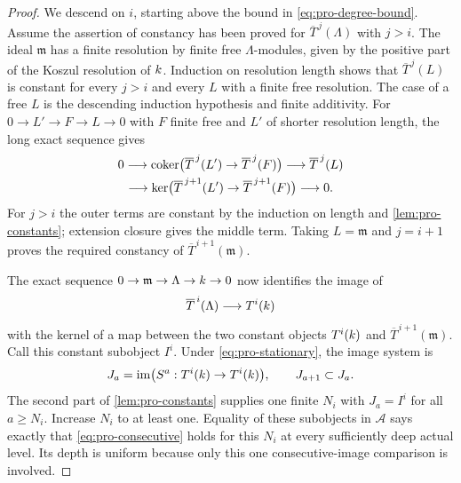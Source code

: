 
\begin{proof}
We descend on $i$, starting above the bound in
\cref{eq:pro-degree-bound}.  Assume the assertion of constancy has
been proved for $\overline T^{\,j}(\Lambda)$ with $j>i$.
The ideal $\mathfrak m$ has a finite resolution by finite free
$\Lambda$-modules, given by the positive part of the Koszul
resolution of $k$.  Induction on resolution length shows that
$\overline T^{\,j}(L)$ is constant for every $j>i$ and every $L$
with a finite free resolution.  The case of a free $L$ is the
descending induction hypothesis and finite additivity.  For
$0\to L'\to F\to L\to0$ with $F$ finite free and $L'$ of shorter
resolution length, the long exact sequence gives
\begin{multline*}
0\longrightarrow
\operatorname{coker}\bigl(\overline T^{\,j}(L')\to\overline T^{\,j}(F)\bigr)
\longrightarrow\overline T^{\,j}(L)\\
\longrightarrow
\ker\bigl(\overline T^{\,j+1}(L')\to\overline T^{\,j+1}(F)\bigr)
\longrightarrow0.
\end{multline*}
For $j>i$ the outer terms are constant by the induction on length
and \cref{lem:pro-constants}; extension closure gives the middle
term.  Taking $L=\mathfrak m$ and $j=i+1$ proves the required
constancy of $\overline T^{\,i+1}(\mathfrak m)$.

The exact sequence $0\to\mathfrak m\to\Lambda\to k\to0$
now identifies the image of
\[
 \overline T^{\,i}(\Lambda)\longrightarrow T^i(k)
\]
with the kernel of a map between the two constant objects
$T^i(k)$ and $\overline T^{\,i+1}(\mathfrak m)$.
Call this constant subobject $I^i$.  Under
\cref{eq:pro-stationary}, the image system is
\[
 J_a=\operatorname{im}\bigl(S^a:T^i(k)\to T^i(k)\bigr),
 \qquad J_{a+1}\subset J_a.
\]
The second part of \cref{lem:pro-constants} supplies one finite
$N_i$ with $J_a=I^i$ for all $a\geq N_i$.  Increase $N_i$ to at
least one.  Equality of these subobjects in $\mathcal A$ says
exactly that \cref{eq:pro-consecutive} holds for this $N_i$ at
every sufficiently deep actual level.  Its depth is uniform
because only this one consecutive-image comparison is involved.


\end{proof}
